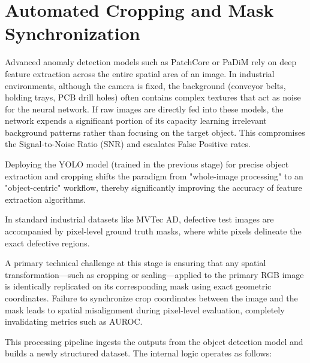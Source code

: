 \documentclass{article}
\begin{document}
\section{Automated Cropping and Mask Synchronization}

Advanced anomaly detection models such as PatchCore or PaDiM rely on deep feature extraction across the entire spatial area of an image. In industrial environments, although the camera is fixed, the background (conveyor belts, holding trays, PCB drill holes) often contains complex textures that act as noise for the neural network. If raw images are directly fed into these models, the network expends a significant portion of its capacity learning irrelevant background patterns rather than focusing on the target object. This compromises the Signal-to-Noise Ratio (SNR) and escalates False Positive rates.

Deploying the YOLO model (trained in the previous stage) for precise object extraction and cropping shifts the paradigm from "whole-image processing" to an "object-centric" workflow, thereby significantly improving the accuracy of feature extraction algorithms.

In standard industrial datasets like MVTec AD, defective test images are accompanied by pixel-level ground truth masks, where white pixels delineate the exact defective regions.

A primary technical challenge at this stage is ensuring that any spatial transformation—such as cropping or scaling—applied to the primary RGB image is identically replicated on its corresponding mask using exact geometric coordinates. Failure to synchronize crop coordinates between the image and the mask leads to spatial misalignment during pixel-level evaluation, completely invalidating metrics such as AUROC.

This processing pipeline ingests the outputs from the object detection model and builds a newly structured dataset. The internal logic operates as follows:
\end{document}
